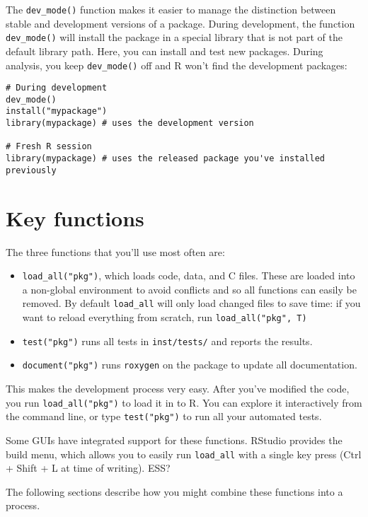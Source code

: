 The \texttt{dev\_mode()} function makes it easier to manage the
distinction between stable and development versions of a package. During
development, the function \texttt{dev\_mode()} will install the package
in a special library that is not part of the default library path. Here,
you can install and test new packages. During analysis, you keep
\texttt{dev\_mode()} off and R won't find the development packages:

\begin{verbatim}
# During development
dev_mode()
install("mypackage")
library(mypackage) # uses the development version

# Fresh R session
library(mypackage) # uses the released package you've installed previously
\end{verbatim}

\section{Key functions}

The three functions that you'll use most often are:

\begin{itemize}
\item
  \texttt{load\_all("pkg")}, which loads code, data, and C files. These
  are loaded into a non-global environment to avoid conflicts and so all
  functions can easily be removed. By default \texttt{load\_all} will
  only load changed files to save time: if you want to reload everything
  from scratch, run \texttt{load\_all("pkg", T)}
\item
  \texttt{test("pkg")} runs all tests in \texttt{inst/tests/} and
  reports the results.
\item
  \texttt{document("pkg")} runs \texttt{roxygen} on the package to
  update all documentation.
\end{itemize}

This makes the development process very easy. After you've modified the
code, you run \texttt{load\_all("pkg")} to load it in to R. You can
explore it interactively from the command line, or type
\texttt{test("pkg")} to run all your automated tests.

Some GUIs have integrated support for these functions. RStudio provides
the build menu, which allows you to easily run \texttt{load\_all} with a
single key press (Ctrl + Shift + L at time of writing). ESS?

The following sections describe how you might combine these functions
into a process.

